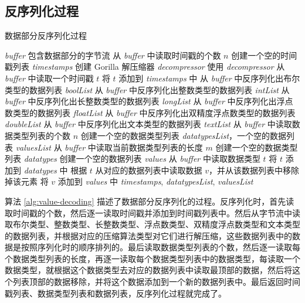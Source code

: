 \subsection{反序列化过程}
\begin{algorithm}
  \caption{数据部分反序列化过程}
  \label{alg:value-decoding}
  \small
  \begin{algorithmic}
    \REQUIRE \emph{buffer} 包含数据部分的字节流
    \STATE 从 \emph{buffer} 中读取时间戳的个数 $n$
    \STATE 创建一个空的时间戳列表 \emph{timestamps}
    \STATE 创建 Gorilla 解压缩器 \emph{decompressor}
      \STATE 使用 \emph{decompressor} 从 \emph{buffer} 中读取一个时间戳 $t$
      \STATE 将 $t$ 添加到 \emph{timestamps} 中
    \ENDFOR
    \STATE 从 \emph{buffer} 中反序列化出布尔类型的数据列表 \emph{boolList}
    \STATE 从 \emph{buffer} 中反序列化出整数类型的数据列表 \emph{intList}
    \STATE 从 \emph{buffer} 中反序列化出长整数类型的数据列表 \emph{longList}
    \STATE 从 \emph{buffer} 中反序列化出浮点数类型的数据列表 \emph{floatList}
    \STATE 从 \emph{buffer} 中反序列化出双精度浮点数类型的数据列表 \emph{doubleList}
    \STATE 从 \emph{buffer} 中反序列化出文本类型的数据列表 \emph{textList}
    \STATE 从 \emph{buffer} 中读取数据类型列表的个数 $n$
    \STATE 创建一个空的数据类型列表 \emph{datatypesList}，一个空的数据列表 \emph{valuesList}
      \STATE 从 \emph{buffer} 中读取当前数据类型列表的长度 $m$
      \STATE 创建一个空的数据类型列表 \emph{datatypes}
      \STATE 创建一个空的数据列表 \emph{values}
        \STATE 从 \emph{buffer} 中读取数据类型 $t$
        \STATE 将 $t$ 添加到 \emph{datatypes} 中
        \STATE 根据 $t$ 从对应的数据列表中读取数据 $v$，并从该数据列表中移除掉该元素
        \STATE 将 $v$ 添加到 \emph{values} 中
    \ENDFOR
    \ENDFOR
    \RETURN \emph{timestamps}, \emph{datatypesList}, \emph{valuesList}
  \end{algorithmic}
\end{algorithm}

算法 \ref{alg:value-decoding} 描述了数据部分反序列化的过程。反序列化时，首先读取时间戳的个数，然后逐一读取时间戳并添加到时间戳列表中。然后从字节流中读取布尔类型、整数类型、长整数类型、浮点数类型、双精度浮点数类型和文本类型的数据列表，并根据对应的压缩算法类型对它们进行解压缩，这些数据列表中的数据是按照序列化时的顺序排列的。最后读取数据类型列表的个数，然后逐一读取每个数据类型列表的长度，再逐一读取每个数据类型列表中的数据类型，每读取一个数据类型，就根据这个数据类型去对应的数据列表中读取最顶部的数据，然后将这个列表顶部的数据移除，并将这个数据添加到一个新的数据列表中。最后返回时间戳列表、数据类型列表和数据列表，反序列化过程就完成了。

